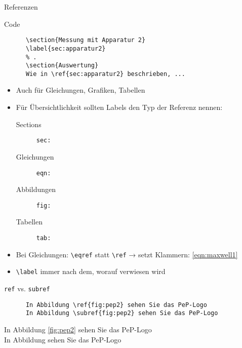 \begin{frame}[fragile]{Referenzen}
  \begin{block}{Code}
    \begin{lstlisting}
      \section{Messung mit Apparatur 2}
      \label{sec:apparatur2}
      % .
      \section{Auswertung}
      Wie in \ref{sec:apparatur2} beschrieben, ...
    \end{lstlisting}
  \end{block}
  \begin{itemize}
    \item Auch für Gleichungen, Grafiken, Tabellen
    \item Für Übersichtlichkeit sollten Labels den Typ der Referenz nennen:
      \begin{description}
        \item[Sections]    \texttt{sec:}
        \item[Gleichungen] \texttt{eqn:}
        \item[Abbildungen] \texttt{fig:}
        \item[Tabellen]    \texttt{tab:}
      \end{description}
    \item Bei Gleichungen: \lstinline+\eqref+ statt \lstinline+\ref+ → setzt Klammern: \eqref{eqn:maxwell1}
    \item \lstinline+\label+ immer nach dem, worauf verwiesen wird
  \end{itemize}
\end{frame}

\begin{frame}[fragile]{\texttt{ref} vs. \texttt{subref}}
  \begin{CodeExample}{0.48}
    \begin{lstlisting}
      In Abbildung \ref{fig:pep2} sehen Sie das PeP-Logo
      In Abbildung \subref{fig:pep2} sehen Sie das PeP-Logo
    \end{lstlisting}
    \CodeResult
      In Abbildung \ref{fig:pep2} sehen Sie das PeP-Logo \\
      In Abbildung  sehen Sie das PeP-Logo
  \end{CodeExample}
\end{frame}
